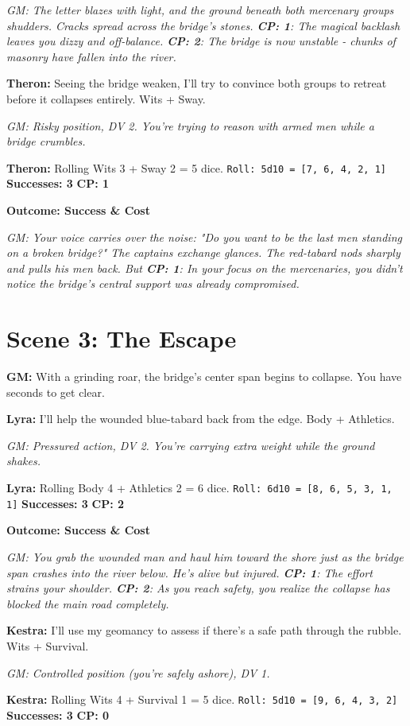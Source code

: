 \documentclass[11pt]{article}
\newcommand{\player}[1]{\textbf{#1:}}
\newcommand{\gm}[1]{\textit{GM: #1}}
\newcommand{\roll}[2]{\texttt{Roll: #1d10 = [#2]}}
\newcommand{\success}[1]{\textbf{Successes: #1}}
\newcommand{\cp}[1]{\textbf{CP: #1}}
\newcommand{\outcome}[1]{\textbf{Outcome: #1}}
\begin{document}
\gm{The letter blazes with light, and the ground beneath both mercenary groups shudders. Cracks spread across the bridge's stones. \cp{1}: The magical backlash leaves you dizzy and off-balance. \cp{2}: The bridge is now unstable - chunks of masonry have fallen into the river.}

\player{Theron} Seeing the bridge weaken, I'll try to convince both groups to retreat before it collapses entirely. Wits + Sway.

\gm{Risky position, DV 2. You're trying to reason with armed men while a bridge crumbles.}

\player{Theron} Rolling Wits 3 + Sway 2 = 5 dice. \roll{5}{7, 6, 4, 2, 1} \success{3} \cp{1}

\outcome{Success \& Cost}

\gm{Your voice carries over the noise: "Do you want to be the last men standing on a broken bridge?" The captains exchange glances. The red-tabard nods sharply and pulls his men back. But \cp{1}: In your focus on the mercenaries, you didn't notice the bridge's central support was already compromised.}

\section*{Scene 3: The Escape}

\player{GM} With a grinding roar, the bridge's center span begins to collapse. You have seconds to get clear.

\player{Lyra} I'll help the wounded blue-tabard back from the edge. Body + Athletics.

\gm{Pressured action, DV 2. You're carrying extra weight while the ground shakes.}

\player{Lyra} Rolling Body 4 + Athletics 2 = 6 dice. \roll{6}{8, 6, 5, 3, 1, 1} \success{3} \cp{2}

\outcome{Success \& Cost}

\gm{You grab the wounded man and haul him toward the shore just as the bridge span crashes into the river below. He's alive but injured. \cp{1}: The effort strains your shoulder. \cp{2}: As you reach safety, you realize the collapse has blocked the main road completely.}

\player{Kestra} I'll use my geomancy to assess if there's a safe path through the rubble. Wits + Survival.

\gm{Controlled position (you're safely ashore), DV 1.}

\player{Kestra} Rolling Wits 4 + Survival 1 = 5 dice. \roll{5}{9, 6, 4, 3, 2} \success{3} \cp{0}
\end{document}
